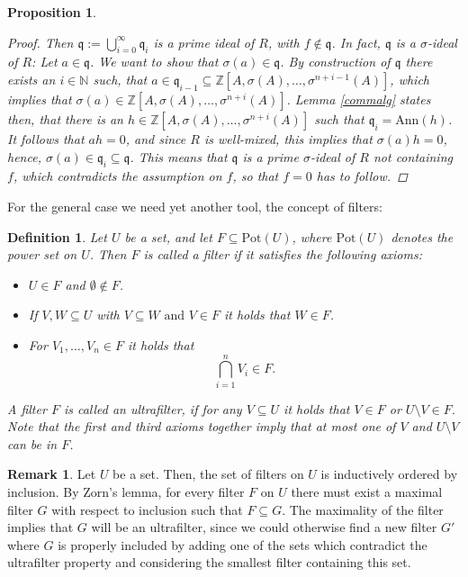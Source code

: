 \documentclass{article}
\def\N{\mathbb{N}}
\def\Z{\mathbb{Z}}
\def\q{\mathfrak{q}}
\def\s{\sigma}
\newenvironment{bew}{\begin{proof}[Proof]}{\end{proof}}
\theoremstyle{plain}
\newtheorem{prop}[Satz]{Proposition}
\newtheorem{defn}[Satz]{Definition}
\theoremstyle{definition}
\newtheorem{rem}[Satz]{Remark}
\begin{document}
\begin{prop}
\begin{bew}
Then $\q := \bigcup_{i=0}^{\infty} \q_i$ is a prime ideal of $R$, with $f \notin \q$. In fact, $\q$ is a $\s$-ideal of $R$: Let $a \in \q$. We want to show that $\s(a) \in \q$. By construction of $\q$ there exists an $i \in \N$ such,
that $a \in \q_{i-1} \subseteq \Z[A,\s(A),\ldots,\s^{n+i-1}(A)]$, which implies that $\s(a) \in \Z[A,\s(A),\ldots,\s^{n+i}(A)]$. Lemma \ref{commalg} states then, that there is an $h \in \Z[A,\s(A),\ldots,\s^{n+i}(A)]$ such that $ \q_i = \text{Ann}(h)$.
It follows that $ah = 0$, and since $R$ is well-mixed, this implies that $\s(a)h = 0$, hence, $\s(a) \in \q_i \subseteq \q$. This means that $\q$ is a prime $\s$-ideal of $R$ not containing $f$, which contradicts the assumption on $f$, so that $f = 0$ has to follow.
\end{bew}
\end{prop}

For the general case we need yet another tool, the concept of filters:

\begin{defn}
Let $U$ be a set, and let $F \subseteq \text{Pot}(U)$, where $\text{Pot}(U)$ denotes the power set on $U$. Then $F$ is called a \emph{filter} if it satisfies the following axioms: 
\begin{itemize}
\item  $U \in F$ and $\emptyset \notin F$.
\item If $V,W \subseteq U$ with $V \subseteq W \text{ and }V  \in F $ it holds that $W \in F$.
\item For $V_1, \ldots, V_n \in F$ it holds that \[ \bigcap_{i = 1}^n V_i \in F. \]
\end{itemize}
A filter $F$ is called an \emph{ultrafilter}, if for any $V \subseteq U$ it holds that $V \in F$ or $U \setminus V \in F$. Note that the first and third axioms together imply that at most one of $V$ and $U \setminus V$ can be in $F$.
\end{defn}



\begin{rem}
Let $U$ be a set. Then, the set of filters on $U$ is inductively ordered by inclusion. By Zorn's lemma, for every filter $F$ on $U$ there must exist a maximal filter $G$ with respect to inclusion such that $F \subseteq G$.
The maximality of the filter implies that $G$ will be an ultrafilter, since we could otherwise find a new filter $G'$ where $G$ is properly included by adding one of the sets which contradict the ultrafilter property and considering the smallest filter containing this set.
\end{rem}
\end{document}

